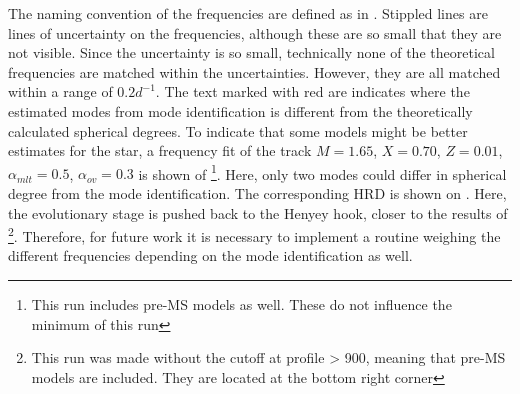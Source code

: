   The naming convention of the frequencies are defined as in . Stippled lines are lines of uncertainty on the frequencies, although these are so small that they are not visible. Since the uncertainty is so small, technically none of the theoretical frequencies are matched within the uncertainties. However, they are all matched within a range of $0.2 d^{-1}$. The text marked with red are indicates where the estimated modes from mode identification is different from the theoretically calculated spherical degrees. To indicate that some models might be better estimates for the star, a frequency fit of the track $M=1.65$, $X=0.70$, $Z=0.01$, $\alpha_{mlt} = 0.5$, $\alpha_{ov}=0.3$ is shown of \footnote{This run includes pre-MS models as well. These do not influence the minimum \chis of this run}. Here, only two modes could differ in spherical degree from the mode identification. The corresponding HRD is shown on . Here, the evolutionary stage is pushed back to the Henyey hook, closer to the results of \citet{lenz2010delta}\footnote{This run was made without the cutoff at profile > 900, meaning that pre-MS models are included. They are located at the bottom right corner}. Therefore, for future work it is necessary to implement a routine weighing the different frequencies depending on the mode identification as well. 
 
